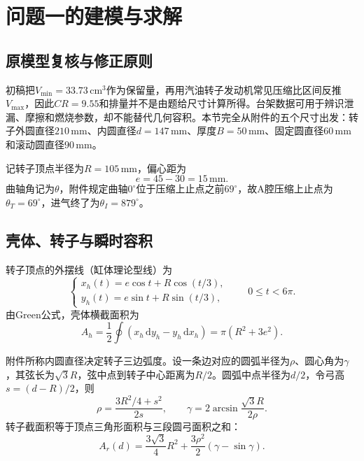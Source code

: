 \section{问题一的建模与求解}

\subsection{原模型复核与修正原则}

初稿把$V_{\min}=33.73\,\mathrm{cm^3}$作为保留量，再用汽油转子发动机常见压缩比区间反推$V_{\max}$，因此$CR=9.55$和排量并不是由题给尺寸计算所得。台架数据可用于辨识泄漏、摩擦和燃烧参数，却不能替代几何容积。本节完全从附件的五个尺寸出发：转子外圆直径$210\,\mathrm{mm}$、内圆直径$d=147\,\mathrm{mm}$、厚度$B=50\,\mathrm{mm}$、固定圆直径$60\,\mathrm{mm}$和滚动圆直径$90\,\mathrm{mm}$。

记转子顶点半径为$R=105\,\mathrm{mm}$，偏心距为
\begin{equation}
 e=45-30=15\,\mathrm{mm}.
\end{equation}
曲轴角记为$\theta$，附件规定曲轴$0^\circ$位于压缩上止点之前$69^\circ$，故A腔压缩上止点为$\theta_T=69^\circ$，进气终了为$\theta_I=879^\circ$。

\subsection{壳体、转子与瞬时容积}

转子顶点的外摆线（缸体理论型线）为
\begin{equation}
 \begin{cases}
 x_h(t)=e\cos t+R\cos(t/3),\\
 y_h(t)=e\sin t+R\sin(t/3),
 \end{cases}\qquad 0\le t<6\pi .
 \label{eq:housing_curve}
\end{equation}
由Green公式，壳体横截面积为
\begin{equation}
 A_h=\frac12\oint(x_h\,\mathrm dy_h-y_h\,\mathrm dx_h)
     =\pi(R^2+3e^2).
 \label{eq:housing_area}
\end{equation}

附件所称内圆直径决定转子三边弧度。设一条边对应的圆弧半径为$\rho$、圆心角为$\gamma$，其弦长为$\sqrt3R$，弦中点到转子中心距离为$R/2$。圆弧中点半径为$d/2$，令弓高$s=(d-R)/2$，则
\begin{equation}
 \rho=\frac{3R^2/4+s^2}{2s},\qquad
 \gamma=2\arcsin\frac{\sqrt3R}{2\rho}.
 \label{eq:arc_geometry}
\end{equation}
转子截面积等于顶点三角形面积与三段圆弓面积之和：
\begin{equation}
 A_r(d)=\frac{3\sqrt3}{4}R^2+\frac{3\rho^2}{2}(\gamma-\sin\gamma).
 \label{eq:rotor_area}
\end{equation}

